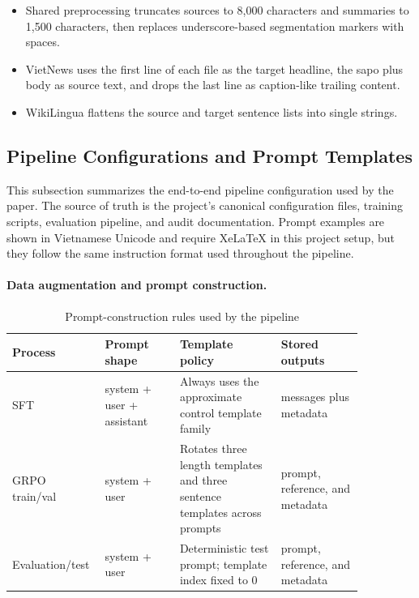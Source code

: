 \documentclass[11pt]{article}
\begin{document}
\begin{itemize}
    \item Shared preprocessing truncates sources to 8,000 characters and summaries to 1,500 characters, then replaces underscore-based segmentation markers with spaces.
    \item VietNews uses the first line of each file as the target headline, the sapo plus body as source text, and drops the last line as caption-like trailing content.
    \item WikiLingua flattens the source and target sentence lists into single strings.
\end{itemize}

\subsection{Pipeline Configurations and Prompt Templates}
\label{sec:appendix-prompts}
This subsection summarizes the end-to-end pipeline configuration used by the paper.
The source of truth is the project's canonical configuration files, training scripts, evaluation pipeline, and audit documentation.
Prompt examples are shown in Vietnamese Unicode and require XeLaTeX in this project setup, but they follow the same instruction format used throughout the pipeline.

\paragraph{Data augmentation and prompt construction.}
\begin{table}[H]
\centering
\caption{Prompt-construction rules used by the pipeline}
\label{tab:appendix-prompt-rules}
\footnotesize
\begin{tabular}{L{0.17\linewidth}L{0.20\linewidth}L{0.27\linewidth}L{0.22\linewidth}}
\toprule
Process & Prompt shape & Template policy & Stored outputs \\
\midrule
SFT & system + user + assistant & Always uses the approximate control template family & messages plus metadata \\
GRPO train/val & system + user & Rotates three length templates and three sentence templates across prompts & prompt, reference, and metadata \\
Evaluation/test & system + user & Deterministic test prompt; template index fixed to 0 & prompt, reference, and metadata \\
\bottomrule
\end{tabular}
\end{table}
\end{document}
